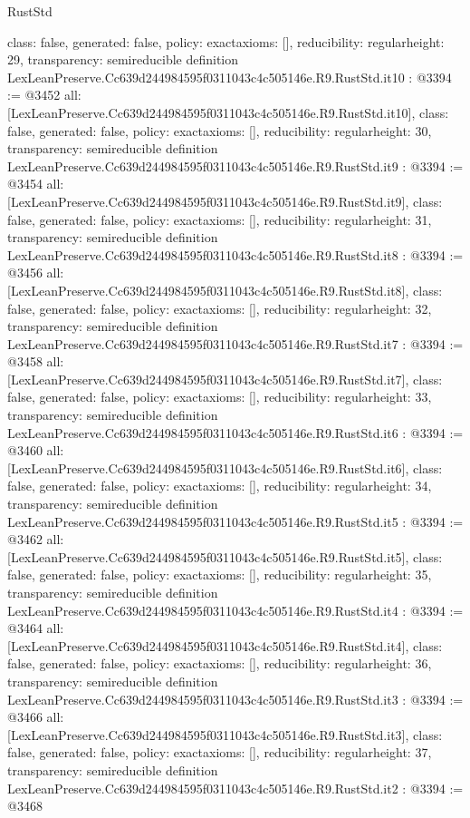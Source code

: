 \begin{lexlean}{RustStd}
\begin{coremodule}
{  class: false,
  generated: false,
  policy: exact{axioms: []},
  reducibility: regular{height: 29},
  transparency: semireducible
}
definition LexLeanPreserve.Cc639d244984595f0311043c4c505146e.R9.RustStd.it10 : @3394 := @3452 {
  all: [LexLeanPreserve.Cc639d244984595f0311043c4c505146e.R9.RustStd.it10],
  class: false,
  generated: false,
  policy: exact{axioms: []},
  reducibility: regular{height: 30},
  transparency: semireducible
}
definition LexLeanPreserve.Cc639d244984595f0311043c4c505146e.R9.RustStd.it9 : @3394 := @3454 {
  all: [LexLeanPreserve.Cc639d244984595f0311043c4c505146e.R9.RustStd.it9],
  class: false,
  generated: false,
  policy: exact{axioms: []},
  reducibility: regular{height: 31},
  transparency: semireducible
}
definition LexLeanPreserve.Cc639d244984595f0311043c4c505146e.R9.RustStd.it8 : @3394 := @3456 {
  all: [LexLeanPreserve.Cc639d244984595f0311043c4c505146e.R9.RustStd.it8],
  class: false,
  generated: false,
  policy: exact{axioms: []},
  reducibility: regular{height: 32},
  transparency: semireducible
}
definition LexLeanPreserve.Cc639d244984595f0311043c4c505146e.R9.RustStd.it7 : @3394 := @3458 {
  all: [LexLeanPreserve.Cc639d244984595f0311043c4c505146e.R9.RustStd.it7],
  class: false,
  generated: false,
  policy: exact{axioms: []},
  reducibility: regular{height: 33},
  transparency: semireducible
}
definition LexLeanPreserve.Cc639d244984595f0311043c4c505146e.R9.RustStd.it6 : @3394 := @3460 {
  all: [LexLeanPreserve.Cc639d244984595f0311043c4c505146e.R9.RustStd.it6],
  class: false,
  generated: false,
  policy: exact{axioms: []},
  reducibility: regular{height: 34},
  transparency: semireducible
}
definition LexLeanPreserve.Cc639d244984595f0311043c4c505146e.R9.RustStd.it5 : @3394 := @3462 {
  all: [LexLeanPreserve.Cc639d244984595f0311043c4c505146e.R9.RustStd.it5],
  class: false,
  generated: false,
  policy: exact{axioms: []},
  reducibility: regular{height: 35},
  transparency: semireducible
}
definition LexLeanPreserve.Cc639d244984595f0311043c4c505146e.R9.RustStd.it4 : @3394 := @3464 {
  all: [LexLeanPreserve.Cc639d244984595f0311043c4c505146e.R9.RustStd.it4],
  class: false,
  generated: false,
  policy: exact{axioms: []},
  reducibility: regular{height: 36},
  transparency: semireducible
}
definition LexLeanPreserve.Cc639d244984595f0311043c4c505146e.R9.RustStd.it3 : @3394 := @3466 {
  all: [LexLeanPreserve.Cc639d244984595f0311043c4c505146e.R9.RustStd.it3],
  class: false,
  generated: false,
  policy: exact{axioms: []},
  reducibility: regular{height: 37},
  transparency: semireducible
}
definition LexLeanPreserve.Cc639d244984595f0311043c4c505146e.R9.RustStd.it2 : @3394 := @3468 {
}
\end{coremodule}
\end{lexlean}
